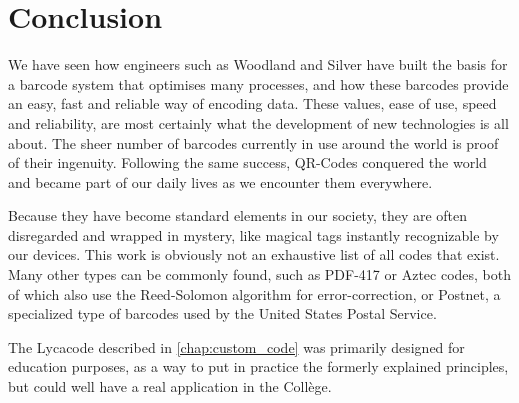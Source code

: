 \chapter{Conclusion}
\label{chap:conclusion}

We have seen how engineers such as Woodland and Silver have built the basis for a barcode system that optimises many processes, and how these barcodes provide an easy, fast and reliable way of encoding data. These values, ease of use, speed and reliability, are most certainly what the development of new technologies is all about.
The sheer number of barcodes currently in use around the world is proof of their ingenuity.
Following the same success, QR-Codes conquered the world and became part of our daily lives as we encounter them everywhere.

Because they have become standard elements in our society, they are often disregarded and wrapped in mystery, like magical tags instantly recognizable by our devices. This work is obviously not an exhaustive list of all codes that exist. Many other types can be commonly found, such as PDF-417 or Aztec codes, both of which also use the Reed-Solomon algorithm for error-correction, or Postnet, a specialized type of barcodes used by the United States Postal Service.

The Lycacode described in \autoref{chap:custom_code} was primarily designed for education purposes, as a way to put in practice the formerly explained principles, but could well have a real application in the Collège.
